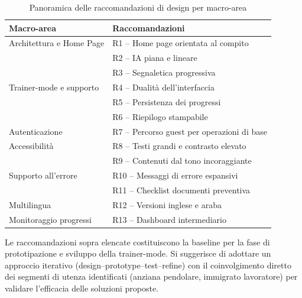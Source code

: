\documentclass[11pt,a4paper]{article}
\begin{document}
\begin{table}[htbp]
\centering
\caption{Panoramica delle raccomandazioni di design per macro-area}
\label{tab:recommendations-summary}
\begin{tabular}{|p{2.8cm}|p{10cm}|}
\hline
\textbf{Macro-area} & \textbf{Raccomandazioni} \\
\hline
Architettura e Home Page & R1 -- Home page orientata al compito \\
& R2 -- IA piana e lineare \\
& R3 -- Segnaletica progressiva \\
\hline
Trainer-mode e supporto & R4 -- Dualit\`a dell'interfaccia \\
& R5 -- Persistenza dei progressi \\
& R6 -- Riepilogo stampabile \\
\hline
Autenticazione & R7 -- Percorso guest per operazioni di base \\
\hline
Accessibilit\`a & R8 -- Testi grandi e contrasto elevato \\
& R9 -- Contenuti dal tono incoraggiante \\
\hline
Supporto all'errore & R10 -- Messaggi di errore espansivi \\
& R11 -- Checklist documenti preventiva \\
\hline
Multilingua & R12 -- Versioni inglese e araba \\
\hline
Monitoraggio progressi & R13 -- Dashboard intermediario \\
\hline
\end{tabular}
\end{table}

\noindent Le raccomandazioni sopra elencate costituiscono la baseline per la
fase di prototipazione e sviluppo della trainer-mode. Si suggerisce di
adottare un approccio iterativo (design--prototype--test--refine) con il
coinvolgimento diretto dei segmenti di utenza identificati (anziana pendolare,
immigrato lavoratore) per validare
l'efficacia delle soluzioni proposte.
\end{document}
